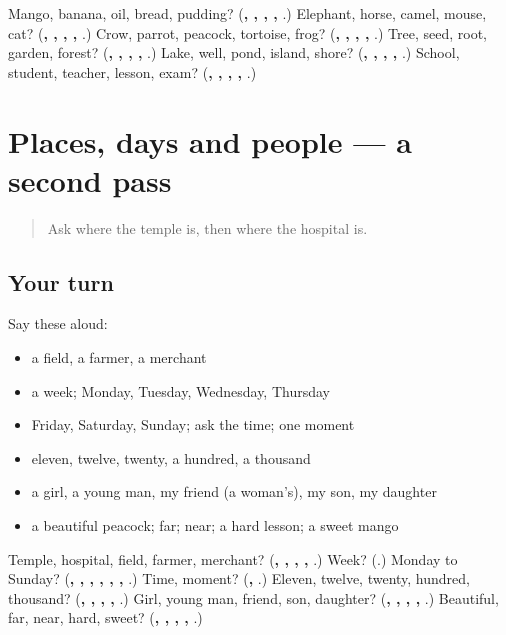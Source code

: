 \begin{tcolorbox}[breakable,colback=teal!4,colframe=teal!35!black,title={Before you move on}]
Mango, banana, oil, bread, pudding? (\textbf{, , , , }.) Elephant, horse, camel, mouse, cat? (\textbf{, , , , }.) Crow, parrot, peacock, tortoise, frog? (\textbf{, , , , }.) Tree, seed, root, garden, forest? (\textbf{, , , , }.) Lake, well, pond, island, shore? (\textbf{, , , , }.) School, student, teacher, lesson, exam? (\textbf{, , , , }.)
\end{tcolorbox}
\section[(dialogue)]{Places, days and people — a second pass}

\label{lesson:SA-R89-second-pass-places-days-people}



\begin{quote}
Ask where the temple is, then where the hospital is.
\end{quote}

\subsection*{Your turn}
Say these aloud:

\begin{itemize}
\raggedright
  \item a field, a farmer, a merchant
  \item a week; Monday, Tuesday, Wednesday, Thursday
  \item Friday, Saturday, Sunday; ask the time; one moment
  \item eleven, twelve, twenty, a hundred, a thousand
  \item a girl, a young man, my friend (a woman's), my son, my daughter
  \item a beautiful peacock; far; near; a hard lesson; a sweet mango
\end{itemize}

\begin{tcolorbox}[breakable,colback=teal!4,colframe=teal!35!black,title={Before you move on}]
Temple, hospital, field, farmer, merchant? (\textbf{, , , , }.) Week? (\textbf{}.) Monday to Sunday? (\textbf{, , , , , , }.) Time, moment? (\textbf{, }.) Eleven, twelve, twenty, hundred, thousand? (\textbf{, , , , }.) Girl, young man, friend, son, daughter? (\textbf{, , , , }.) Beautiful, far, near, hard, sweet? (\textbf{, , , , }.)
\end{tcolorbox}

